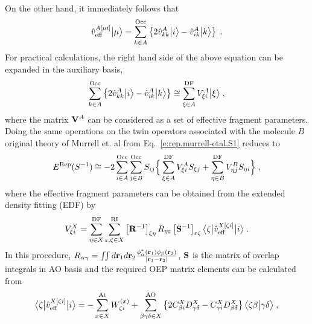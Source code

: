 \documentclass[aip,jcp,amsmath,amssymb,preprint,floatfix]{revtex4-1}
\begin{document}
%
\\ On the other hand, it immediately follows that
%
\begin{equation}
 \hat{v}^{A[\mu i]}_{\rm eff} \Ket{\mu} = 
  \sum_{k\in A}^{\rm Occ} \left\{
     2\hat{v}^A_{kk} \Ket{i} - \hat{v}^A_{ik} \Ket{k}
  \right\} \;.
\end{equation}
%
For practical calculations, the right hand side of the above equation can be expanded 
in the auxiliary basis,
%
\begin{equation} \label{e:v-oep.rep}
  \sum_{k\in A}^{\rm Occ} \left\{
     2\hat{v}^A_{kk} \Ket{i} - \hat{v}^A_{ik} \Ket{k}
  \right\} \cong
  \sum_{\xi\in A}^{\rm DF} 
  V_{\xi i}^A \Ket{\xi} \;,
\end{equation}
%
where the matrix ${\bf V}^A$ can be considered as a set of effective fragment parameters.
Doing the same operations on the twin operators associated with the molecule $B$
original theory of Murrell et. al from Eq.~\eqref{e:rep.murrell-etal.S1}
reduces to
%
\begin{equation} \label{e:rep.murrell-etal.S1.oep}
    E^{\rm Rep}(S^{-1}) \cong 
 -2\sum_{i\in A}^{\rm Occ} \sum_{j\in B}^{\rm Occ}
               S_{ij} \Big\{
           \sum_{\xi \in A}^{\rm DF} V_{\xi i}^A S_{\xi j}
         + \sum_{\eta\in B}^{\rm DF} V_{\eta j}^B S_{\eta i}
                \Big\} \;,
\end{equation}
%
where the
effective fragment parameters
can be obtained 
from the extended density fitting\cite{Blasiak.Bednarska.Choluj.Bartkowiak.JCP.2019} (EDF)
by
%
\begin{equation} \label{e:rep.murrell-etal.S1.oep-edf}
            V_{\xi i}^X = \sum_{\eta\in X}^{\rm DF} 
                          \sum_{\varepsilon,\zeta\in X}^{\rm RI}
                          \left[ {\bf R}^{-1} \right]_{\xi\eta} R_{\eta\varepsilon} 
                          \left[ {\bf S}^{-1} \right]_{\varepsilon\zeta} 
                          \tBraKet{\zeta}{\hat{v}_{\rm eff}^{X[\zeta i]}}{i}
                \;.
\end{equation}
%
In this procedure, $R_{\alpha\gamma}= \iint d{\bf r}_1 d{\bf r}_2 \frac{\phi_{\alpha}^*({\bf r}_1) \phi_{\beta}({\bf r}_2) }{\lvert {\bf r}_1 - {\bf r}_2 \rvert}$, ${\bf S}$ is the matrix of overlap integrals in AO basis
and the required OEP matrix elements can be calculated from
%
\begin{equation} \label{e:rep.murrell-etal.S1.oep-v}
   \tBraKet{\zeta}{\hat{v}_{\rm eff}^{X[\zeta i]}}{i}
     = -\sum_{x\in X}^{\rm At} W_{\zeta i}^{(x)} %
        + \sum_{\beta\gamma\delta\in X}^{\rm AO}
           \left\{ 
             2 C_{\beta i}^X D_{\gamma\delta}^X - C_{\gamma i}^X D_{\beta \delta}^X
           \right\}
           \BraKet{\zeta\beta}{\gamma\delta} \;,
\end{equation}
\end{document}
